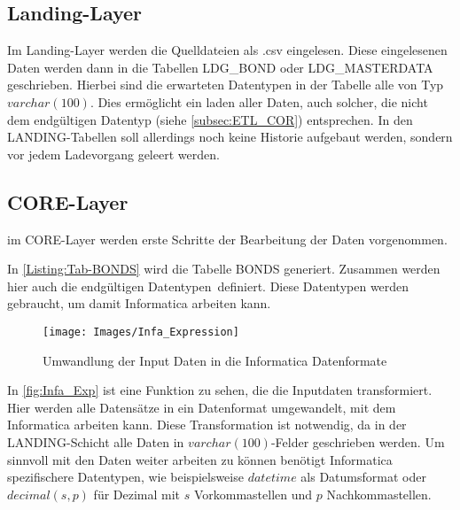\subsection{Landing-Layer}
Im Landing-Layer werden die Quelldateien als .csv eingelesen. Diese eingelesenen Daten werden dann in die Tabellen LDG\_BOND oder LDG\_MASTERDATA geschrieben. Hierbei sind die erwarteten Datentypen in der Tabelle alle von Typ $varchar(100)$. Dies ermöglicht ein laden aller Daten, auch solcher, die nicht dem endgültigen Datentyp (siehe \autoref{subsec:ETL_COR}) entsprechen. In den LANDING-Tabellen soll allerdings noch keine Historie aufgebaut werden, sondern vor jedem Ladevorgang geleert werden.
\subsection{CORE-Layer}\label{subsec:ETL_COR}
im CORE-Layer werden erste Schritte der Bearbeitung der Daten vorgenommen.



In \autoref{Listing:Tab-BONDS} wird die Tabelle BONDS generiert. Zusammen werden hier auch die \glqq endgültigen Datentypen\grqq~definiert. Diese Datentypen werden gebraucht, um damit Informatica arbeiten kann.  
\begin{figure}[H]
	\begin{center}
		\texttt{[image: Images/Infa\_Expression]}
		\caption{Umwandlung der Input Daten in die Informatica Datenformate\cite{Intern}}
		\label{fig:Infa_Exp}
	\end{center}
\end{figure}
In \autoref{fig:Infa_Exp} ist eine Funktion zu sehen, die die Inputdaten transformiert. Hier werden alle Datensätze in ein Datenformat umgewandelt, mit dem Informatica arbeiten kann. Diese Transformation ist notwendig, da in der LANDING-Schicht alle Daten in $varchar(100)$-Felder geschrieben werden. Um sinnvoll mit den Daten weiter arbeiten zu können benötigt Informatica spezifischere Datentypen, wie beispielsweise $datetime$ als Datumsformat oder $decimal(s,p)$ für Dezimal mit $s$ Vorkommastellen und $p$ Nachkommastellen.

